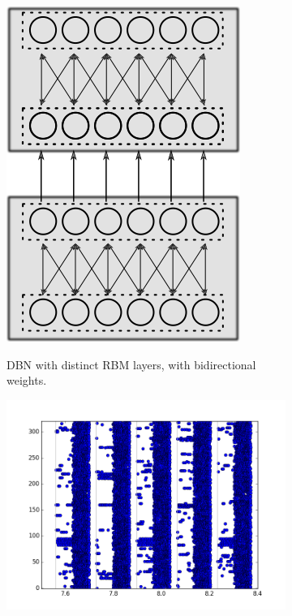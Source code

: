 \begin{figure}[h!]
	
	\begin{subfigure}[t]{.49\textwidth}
  		\centering
  		\includegraphics[width=.4\linewidth]{imgs/spike_dbm.png}
  		\label{fig:sub1}
  		\caption{DBN with distinct RBM layers, with bidirectional weights.}
	\end{subfigure}%
	\begin{subfigure}[t]{.49\textwidth}
  		\centering
  		\includegraphics[width=.9\linewidth]{imgs/app/DBM_sp.png}
  		\label{fig:sub2}
	\end{subfigure}
	

\end{figure}
